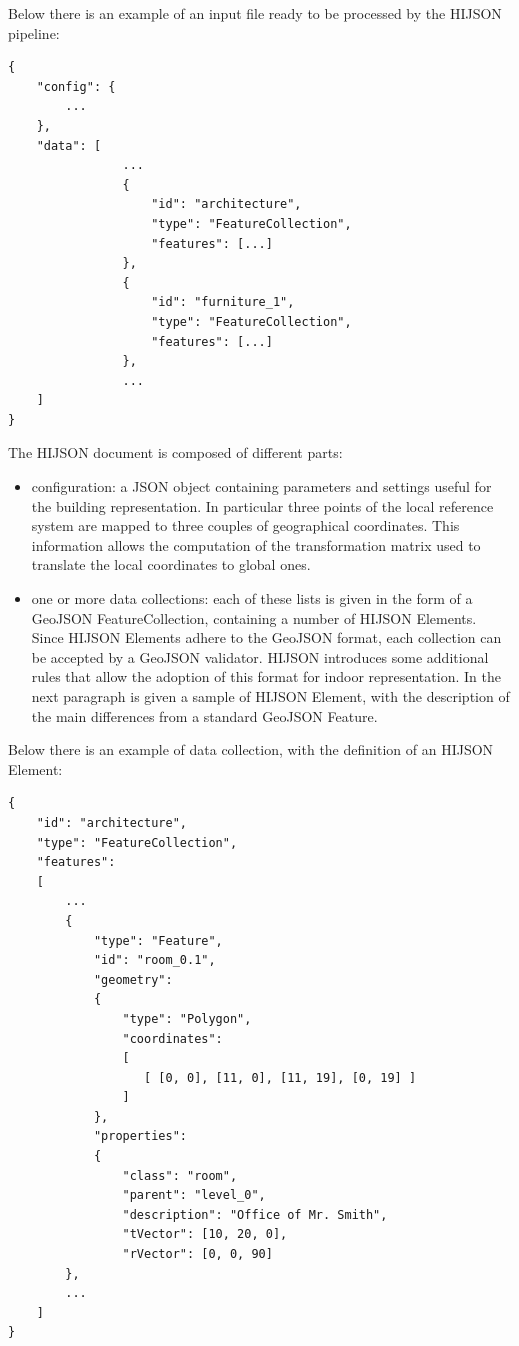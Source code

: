\documentclass{sig-alternate}
\begin{document}
Below there is an example of an input file ready to be processed by the HIJSON pipeline:

\begin{verbatim}
{
    "config": {
        ...
    },
    "data": [
                ...
                {
                    "id": "architecture",
                    "type": "FeatureCollection",
                    "features": [...] 
                },
                {
                    "id": "furniture_1",
                    "type": "FeatureCollection",
                    "features": [...] 
                },
                ...
    ]
}
\end{verbatim}

The HIJSON document is composed of different parts:

\begin{itemize}
\itemsep1pt\parskip0pt
\item
  configuration: a JSON object containing parameters and settings useful
  for the building representation. In particular three points of the
  local reference system are mapped to three couples of geographical
  coordinates. This information allows the computation of the
  transformation matrix used to translate the local coordinates to
  global ones.
\item
  one or more data collections: each of these lists is given in the form
  of a GeoJSON FeatureCollection, containing a number of HIJSON
  Elements. Since HIJSON Elements adhere to the GeoJSON format, each
  collection can be accepted by a GeoJSON validator. HIJSON introduces
  some additional rules that allow the adoption of this format for
  indoor representation. In the next paragraph is given a sample of HIJSON Element, with
  the description of the main differences from a standard GeoJSON
  Feature.
\end{itemize}

Below there is an example of data collection, with the definition of an HIJSON Element:

\begin{verbatim}
{
    "id": "architecture",
    "type": "FeatureCollection",
    "features": 
    [
        ...
        {
            "type": "Feature",
            "id": "room_0.1",
            "geometry": 
            {
                "type": "Polygon",
                "coordinates": 
                [ 
                   [ [0, 0], [11, 0], [11, 19], [0, 19] ]
                ]    
            },
            "properties": 
            {
                "class": "room",
                "parent": "level_0",
                "description": "Office of Mr. Smith",
                "tVector": [10, 20, 0],
                "rVector": [0, 0, 90]
        },
        ...
    ]
}
\end{verbatim}
\end{document}
